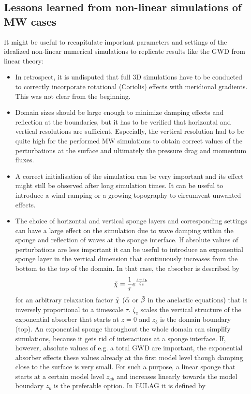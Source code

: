\subsection*{Lessons learned from non-linear simulations of MW cases}
It might be useful to recapitulate important parameters and settings of the idealized non-linear numerical simulations to replicate results like the GWD from linear theory:

\begin{itemize}
    \item In retrospect, it is undisputed that full 3D simulations have to be conducted to correctly incorporate rotational (Coriolis) effects with meridional gradients. This was not clear from the beginning. 
    \item Domain sizes should be large enough to minimize damping effects and reflection at the boundaries, but it has to be verified that horizontal and vertical resolutions are sufficient. Especially, the vertical resolution had to be quite high for the performed MW simulations to obtain correct values of the perturbations at the surface and ultimately the pressure drag and momentum fluxes.
    \item A correct initialisation of the simulation can be very important and its effect might still be observed after long simulation times. It can be useful to introduce a wind ramping or a growing topography to circumvent unwanted effects.
    \item The choice of horizontal and vertical sponge layers and corresponding settings can have a large effect on the simulation due to wave damping within the sponge and reflection of waves at the sponge interface. If absolute values of perturbations are less important it can be useful to introduce an exponential sponge layer in the vertical dimension that continuously increases from the bottom to the top of the domain. In that case, the absorber is described by
    \begin{equation}
        \Tilde{\chi} = \frac{1}{\tau} e^{\frac{z-z_b}{\zeta_z}}
        \label{equ:exp-sponge}
    \end{equation}
    for an arbitrary relaxation factor $\Tilde{\chi}$ ($\Tilde{\alpha}$ or $\Tilde{\beta}$ in the anelastic equations) that is inversely proportional to a timescale $\tau$. $\zeta_z$ scales the vertical structure of the exponential absorber that starts at $z=0$ and $z_b$ is the domain boundary (top). An exponential sponge throughout the whole domain can simplify simulations, because it gets rid of interactions at a sponge interface. If, however, absolute values of e.g. a total GWD are important, the exponential absorber effects these values already at the first model level though damping close to the surface is very small. For such a purpose, a linear sponge that starts at a certain model level $z_{ab}$ and increases linearly towards the model boundary $z_b$ is the preferable option. In EULAG it is defined by

\end{itemize}
